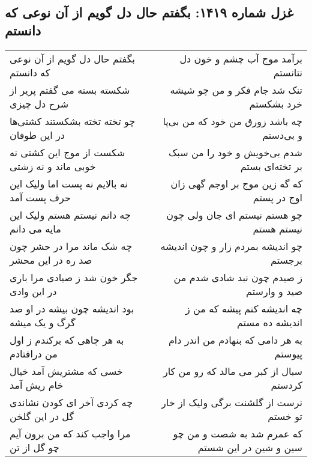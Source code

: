 \begin{center}
\section*{غزل شماره ۱۴۱۹: بگفتم حال دل گویم از آن نوعی که دانستم}
\label{sec:1419}
\begin{longtable}{l p{0.5cm} r}
بگفتم حال دل گویم از آن نوعی که دانستم
&&
برآمد موج آب چشم و خون دل نتانستم
\\
شکسته بسته می گفتم پریر از شرح دل چیزی
&&
تنک شد جام فکر و من چو شیشه خرد بشکستم
\\
چو تخته تخته بشکستند کشتی‌ها در این طوفان
&&
چه باشد زورق من خود که من بی‌پا و بی‌دستم
\\
شکست از موج این کشتی نه خوبی ماند و نه زشتی
&&
شدم بی‌خویش و خود را من سبک بر تخته‌ای بستم
\\
نه بالایم نه پست اما ولیک این حرف پست آمد
&&
که گه زین موج بر اوجم گهی زان اوج در پستم
\\
چه دانم نیستم هستم ولیک این مایه می دانم
&&
چو هستم نیستم ای جان ولی چون نیستم هستم
\\
چه شک ماند مرا در حشر چون صد ره در این محشر
&&
چو اندیشه بمردم زار و چون اندیشه برجستم
\\
جگر خون شد ز صیادی مرا باری در این وادی
&&
ز صیدم چون نبد شادی شدم من صید و وارستم
\\
بود اندیشه چون بیشه در او صد گرگ و یک میشه
&&
چه اندیشه کنم پیشه که من ز اندیشه ده مستم
\\
به هر چاهی که برکندم ز اول من درافتادم
&&
به هر دامی که بنهادم من اندر دام پیوستم
\\
خسی که مشتریش آمد خیال خام ریش آمد
&&
سبال از کبر می مالد که رو من کار کردستم
\\
چه کردی آخر ای کودن نشاندی گل در این گلخن
&&
نرست از گلشنت برگی ولیک از خار تو خستم
\\
مرا واجب کند که من برون آیم چو گل از تن
&&
که عمرم شد به شصت و من چو سین و شین در این شستم
\\
\end{longtable}
\end{center}
